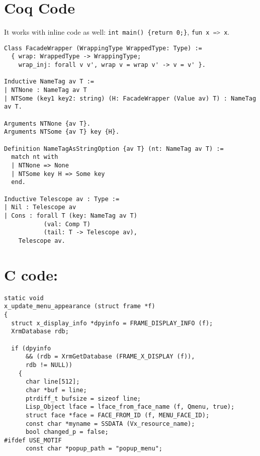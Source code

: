 \documentclass{article}
\def\coqverb{\verb}
\def\cverb{\lstinline[language=c]}
\begin{document}
\section*{Coq Code}

It works with inline code as well: \coqverb|int main() {return 0;}|, \cverb|fun x => x|.

\begin{Verbatim}
Class FacadeWrapper (WrappingType WrappedType: Type) :=
  { wrap: WrappedType -> WrappingType;
    wrap_inj: forall v v', wrap v = wrap v' -> v = v' }.

Inductive NameTag av T :=
| NTNone : NameTag av T
| NTSome (key1 key2: string) (H: FacadeWrapper (Value av) T) : NameTag av T.

Arguments NTNone {av T}.
Arguments NTSome {av T} key {H}.

Definition NameTagAsStringOption {av T} (nt: NameTag av T) :=
  match nt with
  | NTNone => None
  | NTSome key H => Some key
  end.

Inductive Telescope av : Type :=
| Nil : Telescope av
| Cons : forall T (key: NameTag av T)
           (val: Comp T)
           (tail: T -> Telescope av),
    Telescope av.
\end{Verbatim}

\section*{C code:}
\begin{Verbatim}
static void
x_update_menu_appearance (struct frame *f)
{
  struct x_display_info *dpyinfo = FRAME_DISPLAY_INFO (f);
  XrmDatabase rdb;

  if (dpyinfo
      && (rdb = XrmGetDatabase (FRAME_X_DISPLAY (f)),
      rdb != NULL))
    {
      char line[512];
      char *buf = line;
      ptrdiff_t bufsize = sizeof line;
      Lisp_Object lface = lface_from_face_name (f, Qmenu, true);
      struct face *face = FACE_FROM_ID (f, MENU_FACE_ID);
      const char *myname = SSDATA (Vx_resource_name);
      bool changed_p = false;
#ifdef USE_MOTIF
      const char *popup_path = "popup_menu";
\end{Verbatim}
\end{document}
